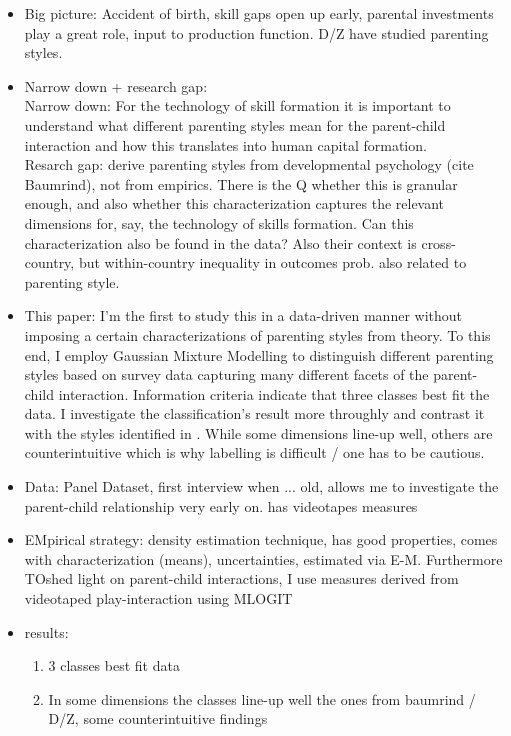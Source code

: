 \begin{itemize}
	\item Big picture: Accident of birth, skill gaps open up early, parental investments play a great role, input to production function. D/Z have studied parenting styles.
	\item Narrow down + research gap:\\ 
	Narrow down: For the technology of skill formation it is important to understand what different parenting styles mean for the parent-child interaction and how this translates into human capital formation.\\
	Resarch gap: \parencites{doepkeParentingStyleAltruism2017}{doepkeEconomicsParenting2019} derive parenting styles from developmental psychology (cite Baumrind), not from empirics. There is the Q whether this is granular enough, and also whether this characterization captures the relevant dimensions for, say, the technology of skills formation. Can this characterization also be found in the data? Also their context is cross-country, but within-country inequality in outcomes prob. also related to parenting style.  
	\item This paper: I'm the first to study this in a data-driven manner without imposing a certain characterizations of parenting styles from theory. To this end, I employ Gaussian Mixture Modelling to distinguish different parenting styles based on survey data capturing many different facets of the parent-child interaction. Information criteria indicate that three classes best fit the data. I investigate the classification's result more throughly and contrast it with the styles identified in \textcite{doepkeParentingStyleAltruism2017}. While some dimensions line-up well, others are counterintuitive which is why labelling is difficult / one has to be cautious.
	\item Data: Panel Dataset, first interview when ... old, allows me to investigate the parent-child relationship very early on. has videotapes measures 
	\item EMpirical strategy: density estimation technique, has good properties, comes with characterization (means), uncertainties, estimated via E-M. Furthermore TOshed light on parent-child interactions, I use measures derived from videotaped play-interaction using MLOGIT
	\item results:
	\begin{enumerate}
		\item 3 classes best fit data
		\item In some dimensions the classes line-up well the ones from baumrind / D/Z, some counterintuitive findings

\end{enumerate}
\end{itemize}
